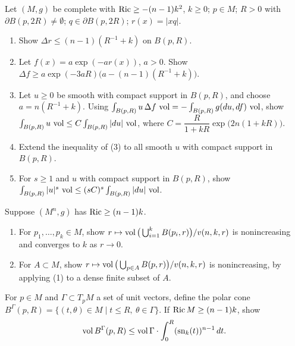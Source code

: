 \begin{remark}
  \label{rem:pet-ch7-ex-17}

  Let $(M,g)$ be complete with $\operatorname{Ric}\ge-(n-1)k^2$, $k\ge0$; $p\in M$; $R>0$
  with $\partial B(p,2R)\ne\emptyset$; $q\in\partial B(p,2R)$;
  $r(x)=|xq|$.
  \begin{enumerate}
    \item[(1)] Show $\Delta r\le(n-1)(R^{-1}+k)$ on $B(p,R)$.
    \item[(2)] Let $f(x)=a\exp(-ar(x))$, $a>0$. Show
      $\Delta f\ge a\exp(-3aR)\big(a-(n-1)(R^{-1}+k)\big)$.
    \item[(3)] Let $u\ge0$ be smooth with compact support in $B(p,R)$, and
      choose $a=n(R^{-1}+k)$. Using
      $\int_{B(p,R)}u\,\Delta f\,\operatorname{vol}=-\int_{B(p,R)}g(du,df)\,\operatorname{vol}$, show
      $\int_{B(p,R)}u\,\operatorname{vol}\le C\int_{B(p,R)}|du|\,\operatorname{vol}$, where
      $C=\dfrac{R}{1+kR}\exp\big(2n(1+kR)\big)$.
    \item[(4)] Extend the inequality of (3) to all smooth $u$ with compact
      support in $B(p,R)$.
    \item[(5)] For $s\ge1$ and $u$ with compact support in $B(p,R)$, show
      $\int_{B(p,R)}|u|^s\,\operatorname{vol}\le(sC)^s\int_{B(p,R)}|du|\,\operatorname{vol}$.
  \end{enumerate}
\end{remark}

\begin{remark}
  \label{rem:pet-ch7-ex-18}

  Suppose $(M^n,g)$ has $\operatorname{Ric}\ge(n-1)k$.
  \begin{enumerate}
    \item[(1)] For $p_1,\dots,p_k\in M$, show
      $r\mapsto\operatorname{vol}\big(\bigcup_{i=1}^kB(p_i,r)\big)/v(n,k,r)$ is
      nonincreasing and converges to $k$ as $r\to0$.
    \item[(2)] For $A\subset M$, show
      $r\mapsto\operatorname{vol}\big(\bigcup_{p\in A}B(p,r)\big)/v(n,k,r)$ is
      nonincreasing, by applying (1) to a dense finite subset of $A$.
  \end{enumerate}
\end{remark}

\begin{remark}
  \label{rem:pet-ch7-ex-19}

  For $p\in M$ and $\Gamma\subset T_pM$ a set of unit vectors, define the
  polar cone $B^\Gamma(p,R)=\{(t,\theta)\in M\mid t\le R,\ \theta\in\Gamma\}$.
  If $\operatorname{Ric} M\ge(n-1)k$, show
  \[
    \operatorname{vol} B^\Gamma(p,R)\le\operatorname{vol}\Gamma\cdot\int_0^R(\mathrm{sn}_k(t))^{n-1}\,dt.
  \]
\end{remark}

